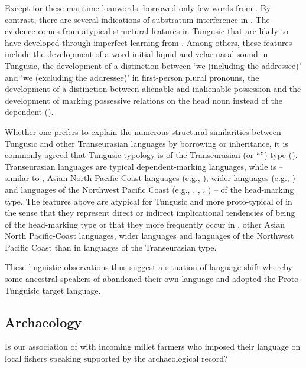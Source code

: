 \documentclass[output=paper,colorlinks,citecolor=brown]{langscibook}
\begin{document}
\begin{sloppypar}
Except for these maritime loanwords,  borrowed only few words from . By contrast, there are several indications of  substratum interference in . The evidence comes from atypical structural features in Tungusic that are likely to have developed through imperfect learning from . Among others, these features include the development of a word-initial liquid and velar nasal sound in Tungusic, the development of a distinction between ‘we (including the addressee)’ and ‘we (excluding the addressee)’ in first-person plural pronouns, the development of a distinction between alienable and inalienable possession and the development of marking possessive relations on the head noun instead of the dependent (\citealt{Robbeets2017a}).

Whether one prefers to explain the numerous structural similarities between Tungusic and other Transeurasian languages by borrowing or inheritance, it is commonly agreed that Tungusic typology is of the Transeurasian (or “”) type (\citealt{Robbeets2017b}). Transeurasian languages are typical dependent-marking languages, while  is – similar to , Asian North Pacific-Coast languages (e.g., ), wider  languages (e.g., ) and languages of  the Northwest Pacific Coast (e.g., , , , ) – of the head-marking type. The features above are atypical for Tungusic and  more proto-typical of  in the sense that they represent direct or indirect implicational tendencies of being of the head-marking type or that they more frequently occur in , other Asian North Pacific-Coast languages, wider  languages   and languages of  the Northwest Pacific Coast than in languages of the Transeurasian type.
\end{sloppypar}

These linguistic observations thus suggest a situation of language shift where\-by some ancestral speakers of  abandoned their own language and adopted the Proto-Tunguisic target language.


\subsection{Archaeology}\label{Section8.5.2}

Is our association of  with incoming millet farmers who imposed their language on local fishers speaking  supported by the archaeological record?
\end{document}
